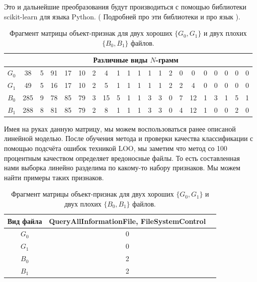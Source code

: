 Это и дальнейшие преобразования будут производиться с помощью библиотеки scikit-learn для языка Python. ( Подробней про эти библиотеки и про язык ).

\bgroup
\def\arraystretch{1.5}%
\begin{table}[ht]
\caption{Фрагмент матрицы объект-признак для двух хороших $\{G_0, G_1\}$ и двух плохих $\{B_0, B_1\}$ файлов.}
\label{tab_weight}
\centering
    \begin{tabular}{|c|c|c|c|c|c|c|c|c|c|c|c|c|c|c|c|c|c|c|c|c|}
    \hline & \multicolumn{20}{c|}{Различные виды $N$-грамм} \\
    \hline $G_0$ & 38 & 5 & 91 & 17 & 10 & 2 & 4 & 1 & 1 & 1 & 1 & 1 & 2 & 0 & 0 & 0 & 0 & 0 & 0 & 0 \\
 	\hline $G_1$ & 49 & 5 & 16 & 17 & 10 & 2 & 5 & 1 & 1 & 1 & 1 & 1 & 2 & 2 & 4 & 0 & 0 & 0 & 0 & 0 \\
 	\hline $B_0$ & 285 & 9 & 78 & 85 & 79 & 3 & 15 & 5 & 1 & 1 & 3 & 3 & 0 & 7 & 12 & 1 & 3 & 1 & 5 & 1 \\
 	\hline $B_1$ & 288 & 8 & 81 & 85 & 79 & 2 & 8 & 1 & 1 & 1 & 3 & 3 & 0 & 4 & 12 & 1 & 0 & 0 & 2 & 0 \\
	\hline
    \end{tabular}
\end{table}
\egroup

Имея на руках данную матрицу, мы можем воспользоваться ранее описаной линейной моделью. После обучения метода и проверки качества классификации с помощью подсчёта ошибок техникой LOO, мы заметим что метод со 100 процентным качеством определяет вредоносные файлы. То есть составленная нами выборка линейно разделима по какому-то набору признаков. Мы можем найти примеры таких признаков.

\bgroup
\def\arraystretch{1.5}%
\begin{table}[ht]
\caption{Фрагмент матрицы объект-признак для двух хороших $\{G_0, G_1\}$ и двух плохих $\{B_0, B_1\}$ файлов.}
\label{tab_weight}
\centering
    \begin{tabular}{|c|c|c|}
    \hline Вид файла & QueryAllInformationFile, FileSystemControl \\
    \hline $G_0$ & 0 \\
 	\hline $G_1$ & 0 \\
 	\hline $B_0$ & 2 \\
 	\hline $B_1$ & 2 \\
	\hline
    \end{tabular}
\end{table}
\egroup

